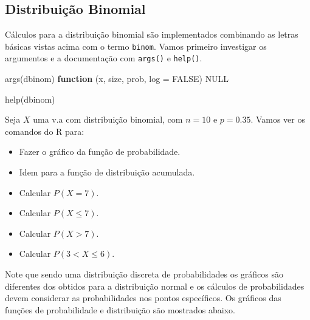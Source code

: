 \documentclass[
  10pt,
  a4paper]{book}
\newenvironment{Shaded}{\begin{snugshade}}{\end{snugshade}}
\newcommand{\AttributeTok}[1]{\textcolor[rgb]{0.77,0.63,0.00}{#1}}
\newcommand{\ConstantTok}[1]{\textcolor[rgb]{0.00,0.00,0.00}{#1}}
\newcommand{\ControlFlowTok}[1]{\textcolor[rgb]{0.13,0.29,0.53}{\textbf{#1}}}
\newcommand{\FunctionTok}[1]{\textcolor[rgb]{0.00,0.00,0.00}{#1}}
\newcommand{\NormalTok}[1]{#1}
\providecommand{\tightlist}{%
  \setlength{\itemsep}{0pt}\setlength{\parskip}{0pt}}
\begin{document}
\hypertarget{distribuiuxe7uxe3o-binomial}{%
\subsection{Distribuição Binomial}\label{distribuiuxe7uxe3o-binomial}}

Cálculos para a distribuição binomial são implementados combinando as
letras básicas vistas acima com o termo \texttt{binom}. Vamos primeiro
investigar os argumentos e a documentação com \texttt{args()} e \texttt{help()}.

\begin{Shaded}
\begin{Highlighting}[]
\FunctionTok{args}\NormalTok{(dbinom)}
\ControlFlowTok{function}\NormalTok{ (x, size, prob, }\AttributeTok{log =} \ConstantTok{FALSE}\NormalTok{) }
\ConstantTok{NULL}
\end{Highlighting}
\end{Shaded}

\begin{Shaded}
\begin{Highlighting}[]
\FunctionTok{help}\NormalTok{(dbinom)}
\end{Highlighting}
\end{Shaded}

Seja \(X\) uma v.a com distribuição binomial, com \(n=10\) e \(p=0.35\). Vamos
ver os comandos do R para:

\begin{itemize}
\tightlist
\item
  Fazer o gráfico da função de probabilidade.
\item
  Idem para a função de distribuição acumulada.
\item
  Calcular \(P(X = 7)\).
\item
  Calcular \(P(X \leq 7)\).
\item
  Calcular \(P(X > 7)\).
\item
  Calcular \(P(3 < X \leq 6)\).
\end{itemize}

Note que sendo uma distribuição discreta de probabilidades os gráficos
são diferentes dos obtidos para a distribuição normal e os cálculos de
probabilidades devem considerar as probabilidades nos pontos específicos.
Os gráficos das funções de probabilidade e distribuição são mostrados abaixo.
\end{document}
